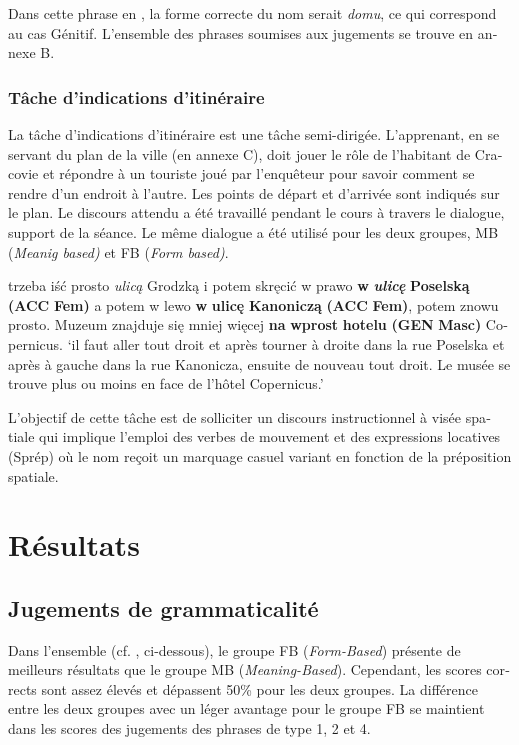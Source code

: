 \documentclass[output=paper]{langscibook}
\begin{document}
\begin{otherlanguage}{french}
Dans cette phrase en , la forme correcte du nom serait \textit{domu}, ce qui correspond au cas Génitif. L’ensemble des phrases soumises aux jugements se trouve en annexe B.


\subsubsection{Tâche d’indications d’itinéraire}\label{sec:watorek:4.4.2}

La tâche d’indications d’itinéraire est une tâche semi-dirigée. L’apprenant, en se servant du plan de la ville (en annexe C), doit jouer le rôle de l’habitant de Cracovie et répondre à un touriste joué par l’enquêteur pour savoir comment se rendre d’un endroit à l’autre. Les points de départ et d’arrivée sont indiqués sur le plan. Le discours attendu a été travaillé pendant le cours à travers le dialogue, support de la séance. Le même dialogue a été utilisé pour les deux groupes, MB (\textit{Meanig based)} et FB (\textit{Form based)}.

\ea    \label{ex:watorek:5}
trzeba iść prosto \textit{ulicą} Grodzką i potem skręcić w prawo \textbf{w} \textbf{\textit{ulicę}} \textbf{Poselską} \textbf{(ACC}   \textbf{Fem)} a potem w lewo \textbf{w} \textbf{ulicę} \textbf{Kanoniczą} \textbf{(ACC} \textbf{Fem)}, potem znowu prosto.   Muzeum znajduje się mniej więcej \textbf{na} \textbf{wprost} \textbf{hotelu} \textbf{(GEN} \textbf{Masc)} Copernicus.
\glt `il faut aller tout droit et après tourner à droite dans la rue Poselska et après à   gauche dans la rue Kanonicza, ensuite de nouveau tout droit. Le musée se trouve   plus ou moins en face de l’hôtel Copernicus.’
\z

L’objectif de cette tâche est de solliciter un discours instructionnel à visée spatiale qui implique l’emploi des verbes de mouvement et des expressions locatives (Sprép) où le nom reçoit un marquage casuel variant en fonction de la préposition spatiale.


\section{Résultats}\label{sec:watorek:5}


\subsection{Jugements de grammaticalité}\label{sec:watorek:5.1}

Dans l’ensemble (cf. , ci-dessous), le groupe FB (\textit{Form-Based}) présente de meilleurs résultats que le groupe MB (\textit{Meaning-Based}). Cependant, les scores corrects sont assez élevés et dépassent 50\% pour les deux groupes. La différence entre les deux groupes avec un léger avantage pour le groupe FB se maintient dans les scores des jugements des phrases de type 1, 2 et 4.


\end{otherlanguage}
\end{document}
